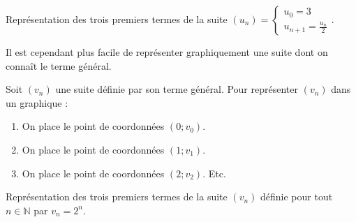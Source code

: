 	\begin{tip}[Exemple]
		Représentation des trois premiers termes de la suite $(u_n) = \begin{cases} u_0 = 3 \\ u_{n+1} = \frac{u_n}{2} \end{cases}$.
	\end{tip}

	Il est cependant plus facile de représenter graphiquement une suite dont on connaît le terme général.

	\begin{formula}
		Soit $(v_n)$ une suite définie par son terme général. Pour représenter $(v_n)$ dans un graphique :
		\begin{enumerate}
			\item On place le point de coordonnées $(0; v_0)$.
			\item On place le point de coordonnées $(1; v_1)$.
			\item On place le point de coordonnées $(2; v_2)$. Etc.
		\end{enumerate}
	\end{formula}

	\begin{tip}[Exemple]
		Représentation des trois premiers termes de la suite $(v_n)$ définie pour tout $n \in \mathbb{N}$ par $v_n = 2^n$.
	\end{tip}


